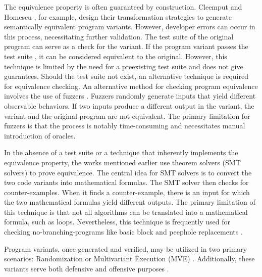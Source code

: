  The equivalence property is often guaranteed by construction. 
Cleemput \etal \cite{Cleemput2012} and Homescu \etal \cite{homescu2013profile}, for example, design their transformation strategies to generate semantically equivalent program variants. 
However, developer errors can occur in this process, necessitating further validation. 
The test suite of the original program can serve as a check for the variant. 
If the program variant passes the test suite \cite{harrand2020java}, it can be considered equivalent to the original. 
However, this technique is limited by the need for a preexisting test suite and does not give guarantees. 
Should the test suite not exist, an alternative technique is required for equivalence checking.
An alternative method for checking program equivalence involves the use of fuzzers \cite{zalewski2017american}.
Fuzzers randomly generate inputs that yield different observable behaviors. 
If two inputs produce a different output in the variant, the variant and the original program are not equivalent. 
The primary limitation for fuzzers is that the process is notably time-consuming and necessitates manual introduction of oracles.

 In the absence of a test suite or a technique that inherently implements the equivalence property, the works mentioned earlier use theorem solvers (SMT solvers) \cite{SMT_solver} to prove equivalence. 
The central idea for SMT solvers is to convert the two code variants into mathematical formulas. 
The SMT solver then checks for counter-examples. When it finds a counter-example, there is an input for which the two mathematical formulas yield different outputs. 
The primary limitation of this technique is that not all algorithms can be translated into a mathematical formula, such as loops. 
Nevertheless, this technique is frequently used for checking no-branching-programs like basic block and peephole replacements \cite{SuperoptimizationScaling}.




Program variants, once generated and verified, may be utilized in two primary scenarios: Randomization or Multivariant Execution (MVE) \cite{jackson}. 
Additionally, these variants serve both defensive and offensive purposes \cite{offensive_div}.


